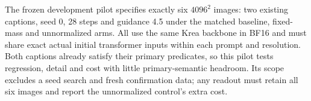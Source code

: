 The frozen development pilot specifies exactly six $4096^2$ images: two existing
captions, seed 0, 28 steps and guidance 4.5 under the matched baseline,
fixed-mass and unnormalized arms. All use the same Krea backbone in BF16 and
must share exact actual initial transformer inputs within each prompt and
resolution. Both captions already satisfy their primary predicates, so this
pilot tests regression, detail and cost with little primary-semantic headroom.
Its scope excludes a seed search and fresh confirmation data; any readout must
retain all six images and report the unnormalized control's extra cost.
